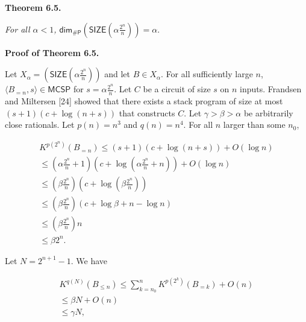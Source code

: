 

\par\medskip\noindent\textbf{
\textbf{Theorem 6.5}\textbf{.}
}\par



\emph{For all $\alpha<1$,
${\mathsf{dim}}_{{\mathsf{\#}\mathsf{P}}}\left(\mathsf{SIZE}\!\left(\alpha\frac{2^{n}}{n}\right)\right)=\alpha.$}\par







\par\medskip\noindent\textbf{Proof of Theorem 6.5.}\par




Let $X_{\alpha}=\left(\mathsf{SIZE}\!\left(\alpha\frac{2^{n}}{n}\right)\right)$ and let $B\in X_{\alpha}$.
For all sufficiently large $n$, $\langle B_{=n},s\rangle\in\mathsf{MCSP}$ for $s=\alpha\frac{2^{n}}{n}$. Let $C$ be a circuit of size $s$ on $n$ inputs. Frandsen and Miltersen [24] showed that there exists a stack program of size at most $(s+1)(c+\log(n+s))$ that constructs $C$. Let $\gamma>\beta>\alpha$ be arbitrarily close rationals. Let $p(n)=n^{3}$ and $q(n)=n^{4}$.
For all $n$ larger than some $n_{0}$,\par


\[\begin{gathered}
\displaystyle K^{p(2^{n})}(B_{=n}) \displaystyle\leq \displaystyle(s+1)(c+\log(n+s))+O(\log n) \\
\displaystyle\leq \displaystyle\left(\alpha\frac{2^{n}}{n}+1\right)\left(c+\log\left(\alpha\frac{2^{n}}{n}+n\right)\right)+O(\log n) \\
\displaystyle\leq \displaystyle\left(\beta\frac{2^{n}}{n}\right)\left(c+\log\left(\beta\frac{2^{n}}{n}\right)\right) \\
\displaystyle\leq \displaystyle\left(\beta\frac{2^{n}}{n}\right)\left(c+\log\beta+n-\log n\right) \\
\displaystyle\leq \displaystyle\left(\beta\frac{2^{n}}{n}\right)n \\
\displaystyle\leq \displaystyle\beta 2^{n}.
\end{gathered}\]


Let $N=2^{n+1}-1$. We have\par


\[\begin{gathered}
\displaystyle K^{q(N)}(B_{\leq n}) \displaystyle\leq \displaystyle\sum_{k=n_{0}}^{n}K^{p(2^{k})}(B_{=k})+O(n) \\
\displaystyle\leq \displaystyle\beta N+O(n) \\
\displaystyle\leq \displaystyle\gamma N,
\end{gathered}\]


